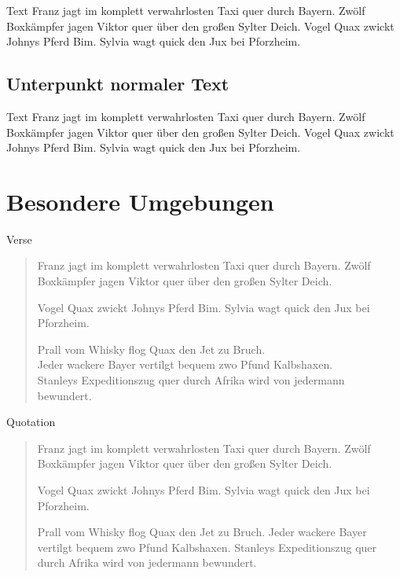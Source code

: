 	\begin{frame}{Text}
		Franz jagt im komplett verwahrlosten Taxi quer durch Bayern.
		Zwölf Boxkämpfer jagen Viktor quer über den großen Sylter Deich.
		Vogel Quax zwickt Johnys Pferd Bim.
		Sylvia wagt quick den Jux bei Pforzheim.
	\end{frame}

	\subsection{Unterpunkt normaler Text}

	\begin{frame}{Text}
		Franz jagt im komplett verwahrlosten Taxi quer durch Bayern.
		Zwölf Boxkämpfer jagen Viktor quer über den großen Sylter Deich.
		Vogel Quax zwickt Johnys Pferd Bim.
		Sylvia wagt quick den Jux bei Pforzheim.
	\end{frame}

	\section{Besondere Umgebungen}

	\begin{frame}{Verse}
		\begin{verse}
			Franz jagt im komplett verwahrlosten Taxi quer durch Bayern.
			Zwölf Boxkämpfer jagen Viktor quer über den großen Sylter Deich.

			Vogel Quax zwickt Johnys Pferd Bim.
			Sylvia wagt quick den Jux bei Pforzheim.

			Prall vom Whisky flog Quax den Jet zu Bruch.\\
			Jeder wackere Bayer vertilgt bequem zwo Pfund Kalbshaxen.\\
			Stanleys Expeditionszug quer durch Afrika wird von jedermann bewundert.\\
		\end{verse}
	\end{frame}


	\begin{frame}{Quotation}
		\begin{quotation}
			Franz jagt im komplett verwahrlosten Taxi quer durch Bayern.
			Zwölf Boxkämpfer jagen Viktor quer über den großen Sylter Deich.

			Vogel Quax zwickt Johnys Pferd Bim.
			Sylvia wagt quick den Jux bei Pforzheim.

			Prall vom Whisky flog Quax den Jet zu Bruch.
			Jeder wackere Bayer vertilgt bequem zwo Pfund Kalbshaxen.
			Stanleys Expeditionszug quer durch Afrika wird von jedermann bewundert.
		\end{quotation}
	\end{frame}


